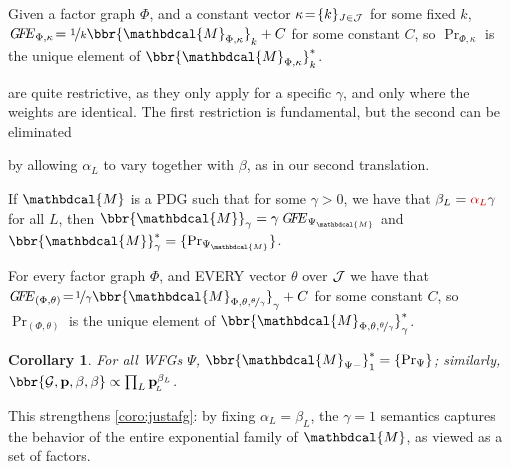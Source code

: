 \documentclass[letterpaper]{article} %
\theoremstyle{plain}
\newtheorem{coro}{Corollary}[theorem]
\theoremstyle{definition}
\theoremstyle{remark}
\newcommand{\begthm}[3][]{\begin{#2}[{name=#1},restate=#3,label=#3]}
\newcommand{\valpha}[1]{{\color{red!80!black}#1}}
\newcommand{\attn}[1]{{\color{violet!50!cyan}#1}}
\newcommand\mat[1]{\mathbf{#1}}
\newcommand{\dg}[1]{\mathbdcal{#1}}
\newcommand\GFE{\mathit{G\mkern-4mu F\mkern-4.5mu E}}
\newcommand{\bp}[1][L]{\mat{p}_{\!_{#1}\!}}
\newcommand{\V}{\mathcal V}
\newcommand{\Gr}{\mathcal G}
\newcommand{\PDGof}[1]{{\dg M}_{#1}}
\newcommand{\WFGof}[1]{\Psi_{{#1}}}
\begin{document}
\begthm{theorem}{thm:fg-is-pdg}
Given a factor graph $\Phi$, 
and a constant vector $\kappa \!=\! \{ k \}_{J \in \cal J}$ for some fixed $k$, 
$\GFE_{\Phi, \kappa}\!= \nicefrac{1}{k}\bbr{\PDGof{\Phi,\kappa}}_{k} + C$  
for some constant $C$, so $\Pr_{\Phi, \kappa}$ is the unique element of 
$\bbr{\PDGof{\Phi,\kappa}}_{k}^*$. 
\end{theorem}
%
 are quite restrictive, as they only apply
for a specific $\gamma$, and only where the weights are identical. The first 
restriction is fundamental, but the second can be eliminated
\valpha{by allowing $\alpha_L$ to vary together with $\beta$, as in our second translation.

\begthm{theorem}{thm:pdg-is-fg2}
If $\dg M$ is a PDG such that for some $\gamma >0$, we have that
$\beta_L = \valpha{\alpha_L} \gamma$ for all  $L$, then
$\bbr{\dg M}_{\gamma} = \gamma\,\GFE_{\WFGof{\dg M}} $ and
$\bbr{\dg M}_{\gamma}^* = \{\Pr_{\WFGof{\dg M}} \}$.
\end{theorem}


\begthm{theorem}{thm:fg-is-pdg2}
For every factor graph $\Phi$, and EVERY vector $\theta$ over $\cal J$ 
we have that
$\GFE_{(\Phi,\theta)} \!=\! \nicefrac1{\gamma} \bbr{\PDGof{\Phi,\theta, \nicefrac\theta\gamma}}_{\gamma} + C$  
for some constant $C$, so
$\Pr_{(\Phi, \theta)}$ is the unique element of $\bbr{\PDGof{\Phi,\theta, \nicefrac\theta\gamma}}_{\gamma}^*$. 
\end{theorem}
\begin{coro}
	For all WFGs $\Psi$, $\bbr{\PDGof{\Psi-}}^*_1 = \{ \Pr_{\Psi} \}$; 
	similarly,
	$ \bbr{\Gr, \mat p, \beta, \beta} \propto \prod_L \bp^{\beta_L}$.
\end{coro}
This strengthens \cref{coro:justafg}: by fixing $\alpha_L = \beta_L$, the $\gamma=1$ semantics captures the behavior of the entire exponential family of $\dg M$, as viewed as a set of factors.
}
\end{document}
